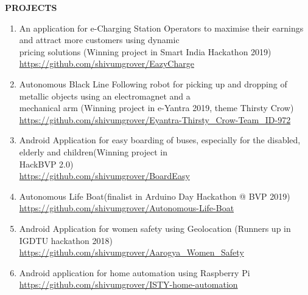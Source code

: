 \documentclass[10pt]{article}
\begin{document}
\begin{minipage}{\textwidth}
\vspace{5mm}
\begin{huge}
\textbf{\color{theme}PROJECTS}
\end{huge}
\begin{mdframed}[backgroundcolor=theme]
\end{mdframed}

\vspace{1mm}

\hspace{-5mm}
\color{black}\normalsize{{
\begin{enumerate}
\item\color{black} An application for e-Charging Station Operators to maximise their earnings and attract more customers using dynamic \\
	pricing solutions (Winning project in Smart India Hackathon 2019)\\
	\color{capri}\url{https://github.com/shivumgrover/EazyCharge}
\color{black} \item  Autonomous Black Line Following robot for picking up and dropping of metallic objects using an electromagnet and a \\
	mechanical arm (Winning project in e-Yantra 2019, theme Thirsty Crow)\\
 	\color{capri}\url{ https://github.com/shivumgrover/Eyantra-Thirsty_Crow-Team_ID-972}

\color{black} \item  Android Application for easy boarding of buses, especially for the disabled, elderly and children(Winning project in\\ HackBVP 2.0)\\
	\color{capri}\url{https://github.com/shivumgrover/BoardEasy}
	
 \color{black} \item  Autonomous Life Boat(finalist in Arduino Day Hackathon @ BVP 2019)\\
	\color{capri}\url{https://github.com/shivumgrover/Autonomous-Life-Boat}
 \color{black} \item  Android Application for women safety using Geolocation (Runners up in IGDTU hackathon 2018)\\
	\color{capri}\url{https://github.com/shivumgrover/Aarogya_Women_Safety}
	
\color{black} \item  Android application for home automation using Raspberry Pi\\
	\color{capri}\url{https://github.com/shivumgrover/ISTY-home-automation}


\end{enumerate}}}
\end{minipage}
\end{document}
